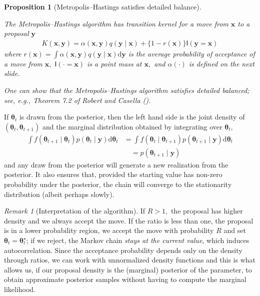 \documentclass[
  11pt,
  letterpaper,
]{scrbook}
\theoremstyle{definition}
\theoremstyle{plain}
\newtheorem{proposition}{Proposition}[chapter]
\theoremstyle{plain}
\theoremstyle{plain}
\theoremstyle{definition}
\theoremstyle{definition}
\theoremstyle{plain}
\newtheorem{proposition}{Proposition}[chapter]
\theoremstyle{plain}
\theoremstyle{remark}
\newtheorem*{remark}{Remark}
\begin{document}
\begin{proposition}[Metropolis--Hastings satisfies detailed
balance]\protect\hypertarget{prp-detailed-balance-mh}{}\label{prp-detailed-balance-mh}

The Metropolis--Hastings algorithm has transition kernel for a move from
\(\boldsymbol{x}\) to a proposal \(\boldsymbol{y}\) \begin{align*}
K(\boldsymbol{x}, \boldsymbol{y}) = \alpha(\boldsymbol{x}, \boldsymbol{y}) q(\boldsymbol{y} \mid \boldsymbol{x}) + \{1- r(\boldsymbol{x})\}\mathsf{I}(\boldsymbol{y}=\boldsymbol{x})
\end{align*} where
\(r(\boldsymbol{x})=\int \alpha(\boldsymbol{x}, \boldsymbol{y}) q(\boldsymbol{y} \mid \boldsymbol{x})\mathrm{d} \boldsymbol{y}\)
is the average probability of acceptance of a move from
\(\boldsymbol{x},\) \(\mathsf{I}(\cdot = \boldsymbol{x})\) is a point
mass at \(\boldsymbol{x},\) and \(\alpha(\cdot)\) is defined on the next
slide.

One can show that the Metropolis--Hastings algorithm satisfies detailed
balanced; see, e.g., Theorem 7.2 of Robert and Casella
().

\end{proposition}

If \(\boldsymbol{\theta}_{t}\) is drawn from the posterior, then the
left hand side is the joint density of
\((\boldsymbol{\theta}_{t}, \boldsymbol{\theta}_{t+1})\) and the
marginal distribution obtained by integrating over
\(\boldsymbol{\theta}_{t},\) \begin{align*}
\int f(\boldsymbol{\theta}_{t+1} \mid \boldsymbol{\theta}_{t})p(\boldsymbol{\theta}_{t} \mid \boldsymbol{y})\mathrm{d} \boldsymbol{\theta}_{t}
& = \int f(\boldsymbol{\theta}_{t} \mid \boldsymbol{\theta}_{t+1})p(\boldsymbol{\theta}_{t+1} \mid \boldsymbol{y})\mathrm{d} \boldsymbol{\theta}_{t} 
\\&\quad= p(\boldsymbol{\theta}_{t+1} \mid \boldsymbol{y})
\end{align*} and any draw from the posterior will generate a new
realization from the posterior. It also ensures that, provided the
starting value has non-zero probability under the posterior, the chain
will converge to the stationarity distribution (albeit perhaps slowly).

\begin{remark}[Interpretation of the algorithm]
If \(R>1,\) the proposal has higher density and we always accept the
move. If the ratio is less than one, the proposal is in a lower
probability region, we accept the move with probability \(R\) and set
\(\boldsymbol{\theta}_{t}=\boldsymbol{\theta}^{\star}_t\); if we reject,
the Markov chain \emph{stays at the current value}, which induces
autocorrelation. Since the acceptance probability depends only on the
density through ratios, we can work with unnormalized density functions
and this is what allows us, if our proposal density is the (marginal)
posterior of the parameter, to obtain approximate posterior samples
without having to compute the marginal likelihood.
\end{remark}
\end{document}
